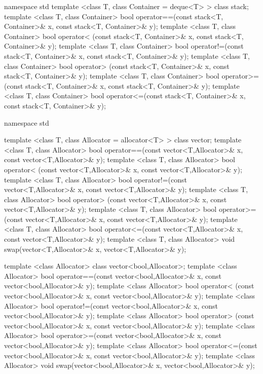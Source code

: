 \begin{codeblock}
namespace std {
  template <class T, class Container = deque<T> > class stack;
  template <class T, class Container>
    bool operator==(const stack<T, Container>& x,
                    const stack<T, Container>& y);
  template <class T, class Container>
    bool operator< (const stack<T, Container>& x,
                    const stack<T, Container>& y);
  template <class T, class Container>
    bool operator!=(const stack<T, Container>& x,
                    const stack<T, Container>& y);
  template <class T, class Container>
    bool operator> (const stack<T, Container>& x,
                    const stack<T, Container>& y);
  template <class T, class Container>
    bool operator>=(const stack<T, Container>& x,
                    const stack<T, Container>& y);
  template <class T, class Container>
    bool operator<=(const stack<T, Container>& x,
                    const stack<T, Container>& y);
}
\end{codeblock}

%

\begin{codeblock}
namespace std {
  template <class T, class Allocator = allocator<T> > class vector;
  template <class T, class Allocator>
    bool operator==(const vector<T,Allocator>& x,
                    const vector<T,Allocator>& y);
  template <class T, class Allocator>
    bool operator< (const vector<T,Allocator>& x,
                    const vector<T,Allocator>& y);
  template <class T, class Allocator>
    bool operator!=(const vector<T,Allocator>& x,
                    const vector<T,Allocator>& y);
  template <class T, class Allocator>
    bool operator> (const vector<T,Allocator>& x,
                    const vector<T,Allocator>& y);
  template <class T, class Allocator>
    bool operator>=(const vector<T,Allocator>& x,
                    const vector<T,Allocator>& y);
  template <class T, class Allocator>
    bool operator<=(const vector<T,Allocator>& x,
                    const vector<T,Allocator>& y);
  template <class T, class Allocator>
    void swap(vector<T,Allocator>& x, vector<T,Allocator>& y);

  template <class Allocator> class vector<bool,Allocator>;
  template <class Allocator>
    bool operator==(const vector<bool,Allocator>& x,
                    const vector<bool,Allocator>& y);
  template <class Allocator>
    bool operator< (const vector<bool,Allocator>& x,
                    const vector<bool,Allocator>& y);
  template <class Allocator>
    bool operator!=(const vector<bool,Allocator>& x,
                    const vector<bool,Allocator>& y);
  template <class Allocator>
    bool operator> (const vector<bool,Allocator>& x,
                    const vector<bool,Allocator>& y);
  template <class Allocator>
    bool operator>=(const vector<bool,Allocator>& x,
                    const vector<bool,Allocator>& y);
  template <class Allocator>
    bool operator<=(const vector<bool,Allocator>& x,
                    const vector<bool,Allocator>& y);
  template <class Allocator>
    void swap(vector<bool,Allocator>& x, vector<bool,Allocator>& y);
}
\end{codeblock}

